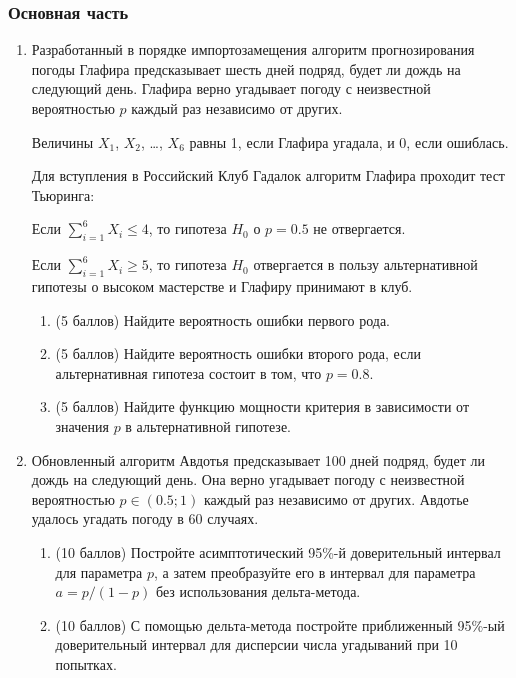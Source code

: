 \subsubsection*{Основная часть}


\begin{enumerate}
	\item Разработанный в порядке импортозамещения алгоритм прогнозирования погоды Глафира предсказывает шесть дней подряд, будет ли дождь на следующий день. Глафира верно угадывает погоду с неизвестной вероятностью $p$ каждый раз независимо от других.
	
	Величины $X_1$, $X_2$, \ldots, $X_6$ равны 1, если Глафира угадала, и 0, если ошиблась. 
	
	Для вступления в Российский Клуб Гадалок алгоритм Глафира проходит тест Тьюринга:
	
	Если $\sum_{i=1}^6 X_i \leq 4$, то гипотеза $H_0$ о $p=0.5$ не отвергается. 
	
	Если $\sum_{i=1}^6 X_i \geq 5$, то гипотеза $H_0$ отвергается в пользу альтернативной гипотезы о высоком мастерстве и Глафиру принимают в клуб.
	
	\begin{enumerate}
		\item (5 баллов) Найдите вероятность ошибки первого рода.
		\item (5 баллов) Найдите вероятность ошибки второго рода,
		если альтернативная гипотеза состоит в том, что $p=0.8$.
		\item (5 баллов) Найдите функцию мощности критерия в зависимости от значения $p$ в альтернативной гипотезе. 
	\end{enumerate}
	
	\item Обновленный алгоритм Авдотья предсказывает 100 дней подряд, будет ли дождь на следующий день. Она верно угадывает погоду с неизвестной вероятностью $p \in (0.5; 1)$ каждый раз независимо от других. 
	Авдотье удалось угадать погоду в 60 случаях. 
	
	
	\begin{enumerate}
	\item (10 баллов) Постройте асимптотический 95\%-й доверительный интервал для параметра $p$, а затем преобразуйте его в интервал для параметра $a= p/(1-p)$ без использования дельта-метода.
	\item (10 баллов) С помощью дельта-метода постройте приближенный 95\%-ый доверительный интервал для дисперсии числа угадываний при 10 попытках.
	\end{enumerate}
	

\end{enumerate}
